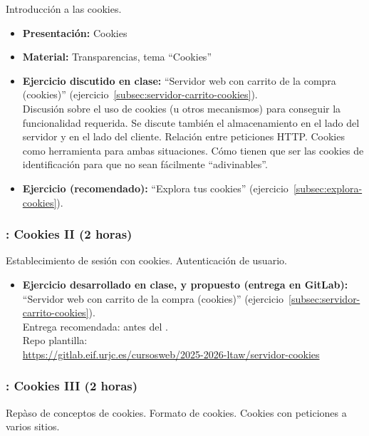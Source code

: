 \documentclass[a4paper,12pt]{article}
\begin{document}
Introducción a las cookies.

\begin{itemize}
\item \textbf{Presentación:} Cookies
\item \textbf{Material:} Transparencias, tema ``Cookies''
\item \textbf{Ejercicio discutido en clase:} ``Servidor web con carrito de la compra (cookies)'' (ejercicio~\ref{subsec:servidor-carrito-cookies}). \\
  Discusión sobre el uso de cookies (u otros mecanismos) para conseguir la funcionalidad requerida. Se discute también el almacenamiento en el lado del servidor y en el lado del cliente. Relación entre peticiones HTTP. Cookies como herramienta para ambas situaciones. Cómo tienen que ser las cookies de identificación para que no sean fácilmente ``adivinables''.
\item \textbf{Ejercicio (recomendado):} ``Explora tus cookies'' (ejercicio~\ref{subsec:explora-cookies}).
\end{itemize}


\subsubsection{\martesC: Cookies II  (2 horas)}
\label{cal:martesC}

Establecimiento de sesión con cookies. Autenticación de usuario.

\begin{itemize}
\item \textbf{Ejercicio desarrollado en clase, y propuesto (entrega en GitLab):} ``Servidor web con carrito de la compra (cookies)'' (ejercicio~\ref{subsec:servidor-carrito-cookies}). \\
  Entrega recomendada: antes del \martesD. \\
  Repo plantilla: \\ {\footnotesize \url{https://gitlab.eif.urjc.es/cursosweb/2025-2026-ltaw/servidor-cookies}}
\end{itemize}


\subsubsection{\lunesD: Cookies III (2 horas)}
\label{cal:lunesD}

Repàso de conceptos de cookies. Formato de cookies. Cookies con peticiones a varios sitios.
\end{document}
